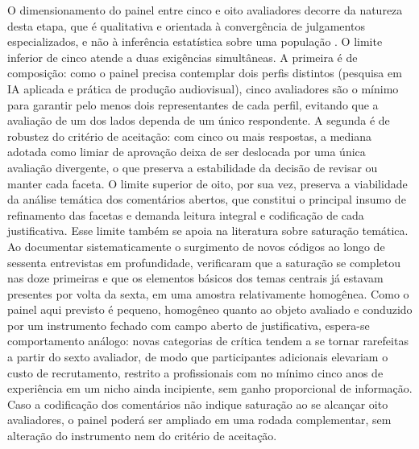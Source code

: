 O dimensionamento do painel entre cinco e oito avaliadores decorre da natureza desta etapa, que é qualitativa e orientada à convergência de julgamentos especializados, e não à inferência estatística sobre uma população \citep{szopinski2019, kundisch2022}. O limite inferior de cinco atende a duas exigências simultâneas. A primeira é de composição: como o painel precisa contemplar dois perfis distintos (pesquisa em IA aplicada e prática de produção audiovisual), cinco avaliadores são o mínimo para garantir pelo menos dois representantes de cada perfil, evitando que a avaliação de um dos lados dependa de um único respondente. A segunda é de robustez do critério de aceitação: com cinco ou mais respostas, a mediana adotada como limiar de aprovação deixa de ser deslocada por uma única avaliação divergente, o que preserva a estabilidade da decisão de revisar ou manter cada faceta. O limite superior de oito, por sua vez, preserva a viabilidade da análise temática dos comentários abertos, que constitui o principal insumo de refinamento das facetas e demanda leitura integral e codificação de cada justificativa. Esse limite também se apoia na literatura sobre saturação temática. Ao documentar sistematicamente o surgimento de novos códigos ao longo de sessenta entrevistas em profundidade, \citet{guest2006} verificaram que a saturação se completou nas doze primeiras e que os elementos básicos dos temas centrais já estavam presentes por volta da sexta, em uma amostra relativamente homogênea. Como o painel aqui previsto é pequeno, homogêneo quanto ao objeto avaliado e conduzido por um instrumento fechado com campo aberto de justificativa, espera-se comportamento análogo: novas categorias de crítica tendem a se tornar rarefeitas a partir do sexto avaliador, de modo que participantes adicionais elevariam o custo de recrutamento, restrito a profissionais com no mínimo cinco anos de experiência em um nicho ainda incipiente, sem ganho proporcional de informação. Caso a codificação dos comentários não indique saturação ao se alcançar oito avaliadores, o painel poderá ser ampliado em uma rodada complementar, sem alteração do instrumento nem do critério de aceitação.

